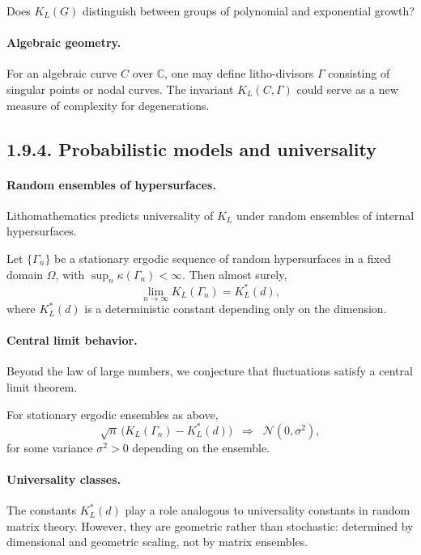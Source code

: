 \begin{problem}
Does $K_L(G)$ distinguish between groups of polynomial and exponential growth?
\end{problem}

\paragraph{Algebraic geometry.}
For an algebraic curve $C$ over $\mathbb{C}$,
one may define litho-divisors $\Gamma$ consisting of singular points or nodal curves.
The invariant $K_L(C,\Gamma)$ could serve as a new measure
of complexity for degenerations.

\subsection*{1.9.4. Probabilistic models and universality}

\paragraph{Random ensembles of hypersurfaces.}
Lithomathematics predicts universality of $K_L$
under random ensembles of internal hypersurfaces.

\begin{theorem}\label{thm:LLN}
Let $\{\Gamma_n\}$ be a stationary ergodic sequence of random hypersurfaces
in a fixed domain $\Omega$, with $\sup_n \kappa(\Gamma_n)<\infty$.
Then almost surely,
\[
\lim_{n\to\infty} K_L(\Gamma_n) = K_L^*(d),
\]
where $K_L^*(d)$ is a deterministic constant depending only on the dimension.
\end{theorem}

\paragraph{Central limit behavior.}
Beyond the law of large numbers,
we conjecture that fluctuations satisfy a central limit theorem.

\begin{conjecture}\label{conj:CLT}
For stationary ergodic ensembles as above,
\[
\sqrt{n}\,\big(K_L(\Gamma_n)-K_L^*(d)\big)\;\;\Longrightarrow\;\; \mathcal{N}(0,\sigma^2),
\]
for some variance $\sigma^2>0$ depending on the ensemble.
\end{conjecture}

\paragraph{Universality classes.}
The constants $K_L^*(d)$ play a role analogous to universality constants
in random matrix theory.
However, they are geometric rather than stochastic:
determined by dimensional and geometric scaling,
not by matrix ensembles.

